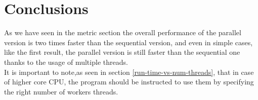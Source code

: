 \documentclass[10pt,twocolumn,letterpaper]{article}
\begin{document}
\section{Conclusions}
As we have seen in the metric section the overall performance of the parallel version is two times faster than the sequential version,
and even in simple cases, like the first result, the parallel version is still faster than the sequential one thanks to the usage of 
multiple threads.\\
It is important to note,as seen in section \ref{run-time-vs-num-threads}, that in case of higher core CPU, the program should 
be instructed to use them by specifying the right number of workers threads.\\
\end{document}

